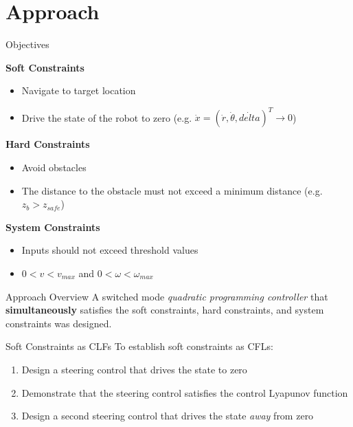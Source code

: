 \documentclass[10pt]{beamer}
\begin{document}
\section{Approach}
\begin{frame}{Objectives}

\textbf{Soft Constraints}
\begin{itemize}
\item Navigate to target location\\
\item Drive the state of the robot to zero (e.g. $\dot{x}=(\dot{r},\dot{\theta},\dot{delta})^T \to 0$)\\ 
\end{itemize}

\textbf{Hard Constraints}
\begin{itemize}
\item Avoid obstacles\\ 
\item The distance to the obstacle must not exceed a minimum distance (e.g. $z_b>z_{safe}$)\\
\end{itemize}

\textbf{System Constraints}
\begin{itemize}
\item Inputs should not exceed threshold values\\ 
\item $0<v<v_{max}$ and $0<\omega<\omega_{max}$\\
\end{itemize}
\end{frame}

\begin{frame}{Approach Overview}
A \alert{switched mode} \emph{quadratic programming controller} that \textbf{simultaneously} satisfies the soft constraints, hard constraints, and system constraints was designed.
\end{frame}

\begin{frame}{Soft Constraints as CLFs}
To establish soft constraints as CFLs:
\begin{enumerate}
\item<1-> Design a steering control that drives the state to zero \cite{park2011}\\
\item<2-> Demonstrate that the steering control satisfies the control Lyapunov function\\
\item<3-> Design a second steering control that drives the state \textit{away} from zero\\
\end{enumerate}
\end{frame}
\end{document}

